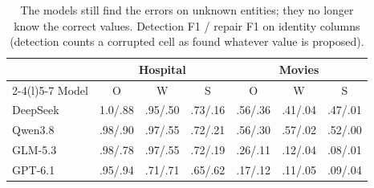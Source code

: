 \begin{table}[t]
  \caption{The models still find the errors on unknown entities; they no longer know the correct values. Detection F1 /
  repair F1 on identity columns (detection counts a corrupted cell as found whatever value is proposed).}
  \label{tab:detection}
  \small
  \setlength{\tabcolsep}{3pt}
  \begin{tabular*}{\columnwidth}{@{\extracolsep{\fill}}l ccc ccc@{}}
    \toprule
    & \multicolumn{3}{c}{Hospital} & \multicolumn{3}{c}{Movies} \\
    \cmidrule(lr){2-4}\cmidrule(l){5-7}
    Model & O & W & S & O & W & S \\
    \midrule
    DeepSeek & 1.0/.88 & .95/.50 & .73/.16 & .56/.36 & .41/.04 & .47/.01 \\
    Qwen3.8 & .98/.90 & .97/.55 & .72/.21 & .56/.30 & .57/.02 & .52/.00 \\
    GLM-5.3 & .98/.78 & .97/.55 & .72/.19 & .26/.11 & .12/.04 & .08/.01 \\
    GPT-6.1 & .95/.94 & .71/.71 & .65/.62 & .17/.12 & .11/.05 & .09/.04 \\
    \bottomrule
  \end{tabular*}
\end{table}
